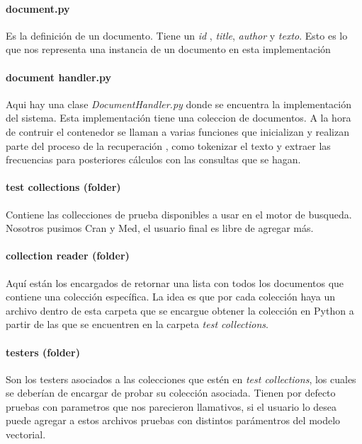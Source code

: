 \documentclass{llncs}
\begin{document}
	
	\paragraph{document.py}
	Es la definici\'on de un documento. Tiene un \textit{id} , \textit{title}, \textit{author} y \textit{texto}. Esto es lo que nos representa una instancia de un documento en esta  implementaci\'on
	
	\paragraph{document handler.py}
	Aqui hay una clase \textit{DocumentHandler.py} donde se encuentra la implementaci\'on del sistema. Esta implementaci\'on tiene una coleccion de documentos. A la hora de contruir el contenedor se llaman a varias funciones que inicializan y realizan parte del proceso de la recuperaci\'on , como tokenizar el texto y extraer las frecuencias para posteriores c\'alculos con las consultas que se hagan.
	
	\paragraph{test collections (folder)}
	Contiene las collecciones de prueba disponibles a usar en el motor de busqueda. Nosotros pusimos Cran y Med, el usuario final es libre de agregar m\'as.
	
	\paragraph{collection reader  (folder)} 
	Aqu\'i est\'an los encargados de retornar una lista con todos los documentos que contiene una colecci\'on espec\'ifica. La idea es que por cada colecci\'on haya un archivo dentro de esta carpeta que se encargue obtener la colecci\'on en Python a partir de las que se encuentren en la carpeta \textit{test collections}.
	
	
	\paragraph{testers (folder)} 
	Son los testers asociados a las colecciones que est\'en en \textit{test collections}, los cuales se deber\'ian de encargar de probar su colecci\'on asociada. Tienen por defecto pruebas con parametros que nos parecieron llamativos, si el usuario lo desea puede agregar a estos archivos pruebas con distintos par\'amentros del modelo vectorial.
	
	
\end{document}
